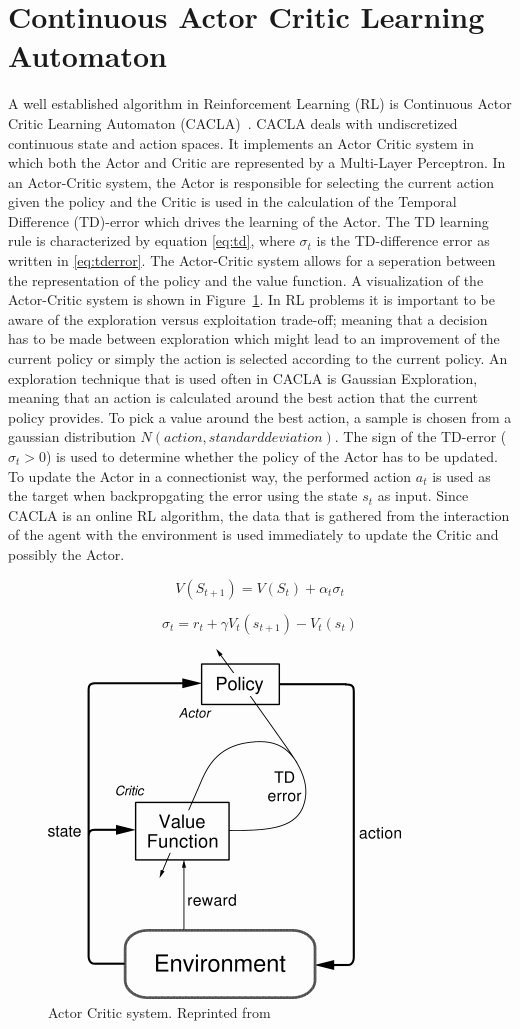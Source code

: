 
\section{Continuous Actor Critic Learning Automaton}
A well established algorithm in Reinforcement Learning (RL) is Continuous Actor Critic Learning Automaton (CACLA)~\cite{van2007reinforcement}. CACLA deals with undiscretized continuous state and action spaces. It implements an Actor Critic system in which both the Actor and Critic are represented by a Multi-Layer Perceptron. In an Actor-Critic system, the Actor is responsible for selecting the current action given the policy and the Critic is used in the calculation of the Temporal Difference (TD)-error which drives the learning of the Actor. The TD learning rule is characterized by equation \eqref{eq:td}, where $\sigma_{t}$ is the TD-difference error as written in \eqref{eq:tderror}. The Actor-Critic system allows for a seperation between the representation of the policy and the value function. A visualization of the Actor-Critic system is shown in Figure~\ref{fig:actorcriticsystem}. In RL problems it is important to be aware of the exploration versus exploitation trade-off; meaning that a decision has to be made between exploration which might lead to an improvement of the current policy or simply the action is selected according to the current policy. An exploration technique that is used often in CACLA is Gaussian Exploration, meaning that an action is calculated around the best action that the current policy provides. To pick a value around the best action, a sample is chosen from a gaussian distribution $N(action, standard deviation)$. The sign of the TD-error ($\sigma_{t} > 0$) is used to determine whether the policy of the Actor has to be updated. To update the Actor in a connectionist way, the performed action $a_{t}$ is used as the target when backpropgating the error using the state $s_{t}$ as input. Since CACLA is an online RL algorithm, the data that is gathered from the interaction of the agent with the environment is used immediately to update the Critic and possibly the Actor. 

\begin{equation}
\label{eq:td}
V(S_{t+1}) = V(S_t) + \alpha_{t} \sigma_{t}
\end{equation}

\begin{equation}
\label{eq:tderror}
\sigma_{t} = r_{t} + \gamma V_{t}(s_{t+1}) - V_{t}(s_{t})
\end{equation}

\begin{figure}[t]
 \centering 
    \includegraphics[width = 0.35\columnwidth]{figs/actorcritic.png}
 \caption{Actor Critic system. Reprinted from~\cite{sutton1998reinforcement}}
\label{fig:actorcriticsystem}
\end{figure}



